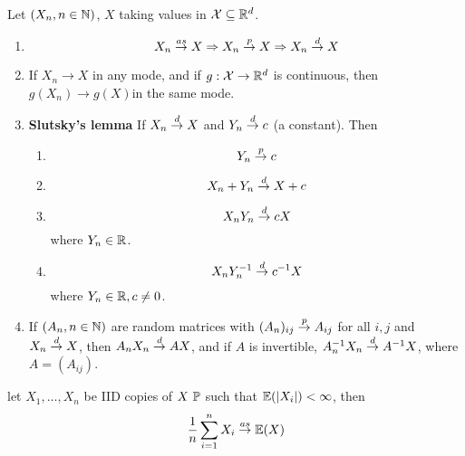 \begin{proposition}
  Let $(X_{n}, n \in \mathbb{N})$, $X$ taking values in $\mathcal{X} \subseteq
  \mathbb{R}^{d}$.
  \begin{enumerate}
  \item
    \begin{equation}
      \label{eq:9}
      X_{n} \overset{as}{\rightarrow} X \Rightarrow X_{n} \overset{p}{\rightarrow} X \Rightarrow X_{n} \overset{d}{\rightarrow} X
    \end{equation}
  \item If $X_{n} \rightarrow X$ in any mode, and if $g: \mathcal{X}
    \rightarrow \mathbb{R}^{d}$ is continuous, then $g(X_{n}) \rightarrow
    g(X)$in the same mode.
  \item \textbf{Slutsky's lemma} If $X_{n} \overset{d}{\rightarrow} X$ and $Y_{n} \overset{d}{\rightarrow} c$ (a
    constant). Then
    \begin{enumerate}
    \item
      \begin{equation}
        \label{eq:10}
        Y_{n} \overset{p}{\rightarrow} c
      \end{equation}
    \item
      \begin{equation}
        \label{eq:11}
        X_{n} + Y_{n}\overset{d}{\rightarrow} X + c
      \end{equation}

    \item
      \begin{equation}
        \label{eq:12}
        X_{n} Y_{n} \overset{d}{\rightarrow} cX
      \end{equation} where $Y_{n} \in \mathbb{R}$.
    \item
      \begin{equation}
        \label{eq:13}
        X_{n} Y_{n}^{{-1}} \overset{d}{\rightarrow} c^{-1} X
      \end{equation} where $Y_{n} \in \mathbb{R}, c \neq 0$.
    \end{enumerate}
  \item If $(A_{n}, n \in \mathbb{N})$ are random matrices with
    $(A_{n})_{{ij}} \overset{p}{\rightarrow} A_{ij}$ for all $i, j$ and $X_{n} \overset{d}{\rightarrow} X$, then
    $A_{n} X_{n} \overset{d}{\rightarrow} AX$, and if $A$ is invertible, $A_{n}^{-1} X_{n}
    \overset{d}{\rightarrow} A^{-1}X$, where $A = (A_{ij})$.
  \end{enumerate}
\end{proposition}

\begin{thm}
  \label{defn:stochastic_convergence_concepts:1}
  let $X_{1}, \dots, X_n$ be IID copies of $X ~ \Prob$ such that
  $\E{|X_{i}|} < \infty$, then
  \begin{equation}
    \label{eq:18}
    \frac{1}{n} \sum_{i=1}^{n} X_{i} \cas \E{X}
  \end{equation}
\end{thm}

